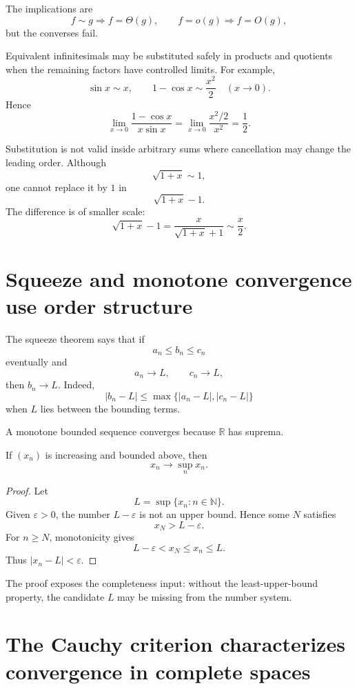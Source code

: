 The implications are
\[
  f\sim g
  \Longrightarrow
  f=\Theta(g),
  \qquad
  f=o(g)
  \Longrightarrow
  f=O(g),
\]
but the converses fail.

Equivalent infinitesimals may be substituted safely in products and quotients when the remaining factors have controlled limits.  For example,
\[
  \sin x\sim x,
  \qquad
  1-\cos x\sim\frac{x^2}{2}
  \quad(x\to0).
\]
Hence
\[
  \lim_{x\to0}
  \frac{1-\cos x}{x\sin x}
  =\lim_{x\to0}
  \frac{x^2/2}{x^2}
  =\frac12.
\]

Substitution is not valid inside arbitrary sums where cancellation may change the leading order.  Although
\[
  \sqrt{1+x}\sim1,
\]
one cannot replace it by \(1\) in
\[
  \sqrt{1+x}-1.
\]
The difference is of smaller scale:
\[
  \sqrt{1+x}-1
  =\frac{x}{\sqrt{1+x}+1}
  \sim\frac x2.
\]

\section{Squeeze and monotone convergence use order structure}

The squeeze theorem says that if
\[
  a_n\le b_n\le c_n
\]
eventually and
\[
  a_n\to L,
  \qquad
  c_n\to L,
\]
then \(b_n\to L\).  Indeed,
\[
  |b_n-L|
  \le\max\{|a_n-L|,|c_n-L|\}
\]
when \(L\) lies between the bounding terms.

A monotone bounded sequence converges because \(\mathbb R\) has suprema.

\begin{theorem}
If \((x_n)\) is increasing and bounded above, then
\[
  x_n\to\sup_n x_n.
\]
\end{theorem}

\begin{proof}
Let
\[
  L=\sup\{x_n:n\in\mathbb N\}.
\]
Given \(\varepsilon>0\), the number \(L-\varepsilon\) is not an upper bound.  Hence some \(N\) satisfies
\[
  x_N>L-\varepsilon.
\]
For \(n\ge N\), monotonicity gives
\[
  L-\varepsilon<x_N\le x_n\le L.
\]
Thus \(|x_n-L|<\varepsilon\).
\end{proof}

The proof exposes the completeness input: without the least-upper-bound property, the candidate \(L\) may be missing from the number system.

\section{The Cauchy criterion characterizes convergence in complete spaces}

